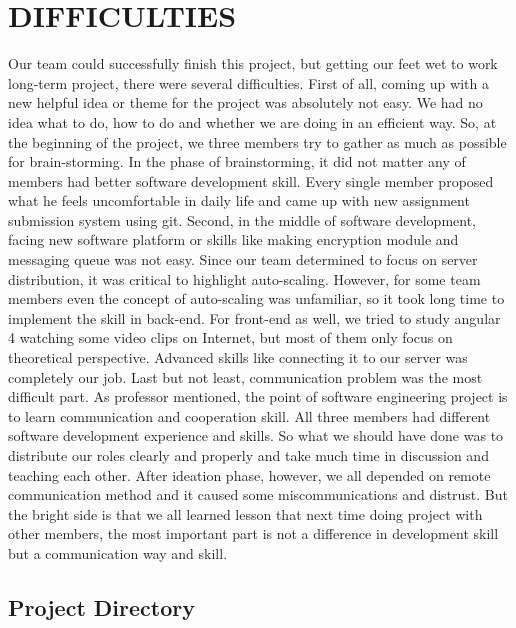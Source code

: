 \documentclass[10pt,journal,compsoc]{IEEEtran}
\begin{document}
\ifCLASSOPTIONcompsoc
{}
\else
\section{DIFFICULTIES}
\label{DIFFICULTIES}
\fi
Our team could successfully finish this project, but getting our feet wet to work long-term project, there were several difficulties. First of all, coming up with a new helpful idea or theme for the project was absolutely not easy. We had no idea what to do, how to do and whether we are doing in an efficient way. So, at the beginning of the project, we three members try to gather as much as possible for brain-storming. In the phase of brainstorming, it did not matter any of members had better software development skill. Every single member proposed what he feels uncomfortable in daily life and came up with new assignment submission system using git. Second, in the middle of software development, facing new software platform or skills like making encryption module and messaging queue was not easy. Since our team determined to focus on server distribution, it was critical to highlight auto-scaling. However, for some team members even the concept of auto-scaling was unfamiliar, so it took long time to implement the skill in back-end. For front-end as well, we tried to study angular 4 watching some video clips on Internet, but most of them only focus on theoretical perspective. Advanced skills like connecting it to our server was completely our job. Last but not least, communication problem was the most difficult part. As professor mentioned, the point of software engineering project is to learn communication and cooperation skill. All three members had different software development experience and skills. So what we should have done was to distribute our roles clearly and properly and take much time in discussion and teaching each other. After ideation phase, however, we all depended on remote communication method and it caused some miscommunications and distrust. But the bright side is that we all learned lesson that next time doing project with other members, the most important part is not a difference in development skill but a communication way and skill. 
\subsection{Project Directory}
\end{document}

